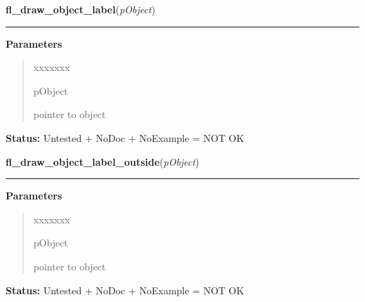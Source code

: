 \hspace{.8\funcindent}\begin{boxedminipage}{\funcwidth}

    \raggedright \textbf{fl\_draw\_object\_label}(\textit{pObject})

    \vspace{-1.5ex}

    \rule{\textwidth}{0.5\fboxrule}
\setlength{\parskip}{2ex}
\setlength{\parskip}{1ex}
      \textbf{Parameters}
      \vspace{-1ex}

      \begin{quote}
        \begin{Ventry}{xxxxxxx}

          \item[pObject]

          pointer to object

        \end{Ventry}

      \end{quote}

\textbf{Status:} Untested + NoDoc + NoExample = NOT OK



    \end{boxedminipage}

    \label{xformslib:library:fl_draw_object_label_outside}

    \vspace{0.5ex}

\hspace{.8\funcindent}\begin{boxedminipage}{\funcwidth}

    \raggedright \textbf{fl\_draw\_object\_label\_outside}(\textit{pObject})

    \vspace{-1.5ex}

    \rule{\textwidth}{0.5\fboxrule}
\setlength{\parskip}{2ex}
\setlength{\parskip}{1ex}
      \textbf{Parameters}
      \vspace{-1ex}

      \begin{quote}
        \begin{Ventry}{xxxxxxx}

          \item[pObject]

          pointer to object

        \end{Ventry}

      \end{quote}

\textbf{Status:} Untested + NoDoc + NoExample = NOT OK



    \end{boxedminipage}


